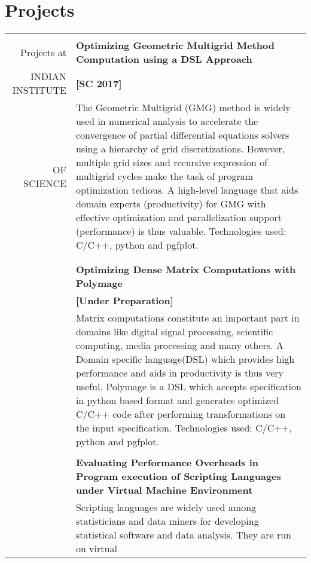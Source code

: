 \documentclass[a4paper,10pt]{article} %
\begin{document}
\section{Projects}
\begin{tabular}{rp{13cm}}
&\\
Projects at & \textbf{Optimizing Geometric Multigrid Method Computation using a DSL Approach} \\
INDIAN INSTITUTE & \hspace{25em} \textbf{[SC 2017]} \\
OF SCIENCE 
& \setlength{\leftskip}{0.4cm}
The Geometric Multigrid (GMG) method is widely used in numerical analysis to accelerate the convergence of partial differential equations solvers using
a hierarchy of grid discretizations. However, multiple grid sizes and recursive 
expression of multigrid cycles make the task of program optimization tedious.
A high-level language that aids domain experts (productivity) for GMG with
effective optimization and parallelization support (performance) is thus
valuable. Technologies used: C/C++, python and pgfplot.\\
& \\
& \\
& \textbf{Optimizing Dense Matrix Computations with Polymage } \\
& \hspace{25em} \textbf{[Under Preparation]}\\
& \setlength{\leftskip}{0.4cm}
Matrix computations constitute an important part in domains like digital signal
processing, scientific computing, media processing and many others. A Domain
specific language(DSL) which provides high performance and aids in productivity is
thus very useful. Polymage is a DSL which accepts specification in python based
format and generates optimized C/C++ code after performing transformations on
the input specification. Technologies used: C/C++, python and pgfplot.\\
&\\
& \textbf{Evaluating Performance Overheads in Program execution of Scripting Languages under Virtual Machine Environment} \\
& \setlength{\leftskip}{0.4cm}
Scripting languages are widely used among statisticians and data miners for
developing statistical software and data analysis. They are run on virtual

\end{tabular}
\end{document}
